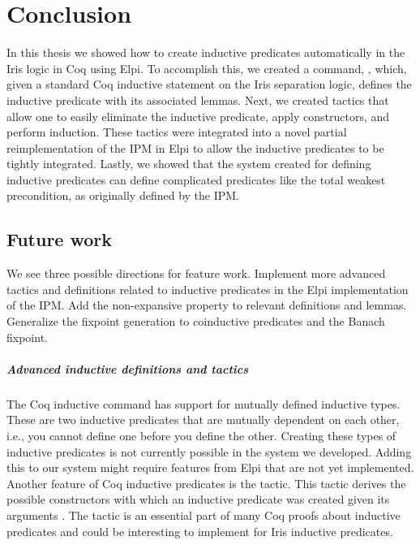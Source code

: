 \documentclass[thesis.tex]{subfiles}
\begin{document}
\VerbatimFootnotes

\chapter{Conclusion}\label{ch:conclusion}
In this thesis we showed how to create inductive predicates automatically in the Iris logic in Coq using Elpi. To accomplish this, we created a command, , which, given a standard Coq inductive statement on the Iris separation logic, defines the inductive predicate with its associated lemmas. Next, we created tactics that allow one to easily eliminate the inductive predicate, apply constructors, and perform induction. These tactics were integrated into a novel partial reimplementation of the IPM in Elpi to allow the inductive predicates to be tightly integrated. Lastly, we showed that the system created for defining inductive predicates can define complicated predicates like the total weakest precondition, as originally defined by the IPM.

\section{Future work}
We see three possible directions for feature work. Implement more advanced tactics and definitions related to inductive predicates in the Elpi implementation of the IPM. Add the non-expansive property to relevant definitions and lemmas. Generalize the fixpoint generation to coinductive predicates and the Banach fixpoint.

\paragraph{Advanced inductive definitions and tactics}
The Coq inductive command has support for mutually defined inductive types. These are two inductive predicates that are mutually dependent on each other, i.e., you cannot define one before you define the other. Creating these types of inductive predicates is not currently possible in the system we developed. Adding this to our system might require features from Elpi that are not yet implemented. Another feature of Coq inductive predicates is the  tactic. This tactic derives the possible constructors with which an inductive predicate was created given its arguments \cite{cornesAutomatingInversionInductive1996}. The  tactic is an essential part of many Coq proofs about inductive predicates and could be interesting to implement for Iris inductive predicates.
\end{document}

